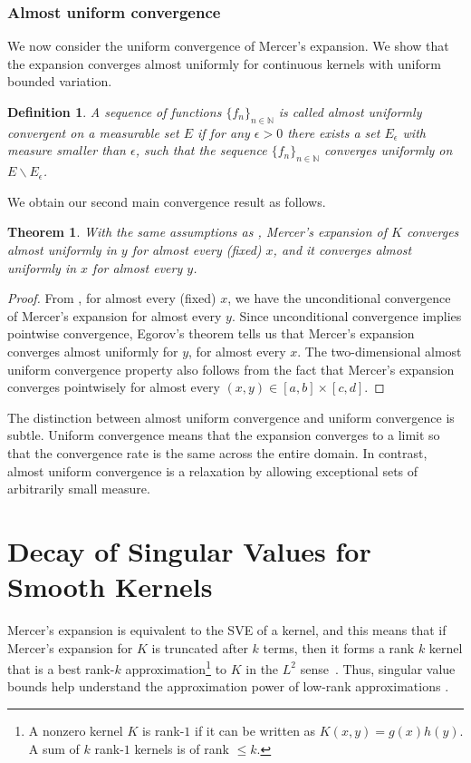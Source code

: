 \documentclass{article}
\newtheorem{theorem}{Theorem}
\newtheorem{definition}{Definition}
\begin{document}
\subsubsection{Almost uniform convergence}
We now consider the uniform convergence of Mercer's expansion. We show that the expansion converges almost uniformly for continuous kernels with uniform bounded variation.
\begin{definition}
A sequence of functions $\{f_n\}_{n\in\mathbb{N}}$ is called almost uniformly convergent on a measurable set $E$ if for any $\epsilon>0$ there exists a set $E_\epsilon$ with measure smaller than $\epsilon$, such that the sequence $\{f_n\}_{n\in\mathbb{N}}$ converges uniformly on $E\backslash E_\epsilon$.
\end{definition}

We obtain our second main convergence result as follows. 
\begin{theorem}\label{thm:almostuniform}
With the same assumptions as , Mercer's expansion of $K$ converges almost uniformly in $y$ for almost every (fixed) $x$, and it converges almost uniformly in $x$ for almost every $y$. 
\end{theorem}
\begin{proof}
From , for almost every (fixed) $x$, we have the unconditional convergence of Mercer's expansion for almost every $y$. Since unconditional convergence implies pointwise convergence, Egorov's theorem \citep{egoroff1911suites} tells us that Mercer's expansion converges almost uniformly for $y$, for almost every $x$. The two-dimensional almost uniform convergence property also follows from the fact that Mercer's expansion converges pointwisely for almost every $(x, y)\in[a,b]\times [c,d]$. 
\end{proof}

The distinction between almost uniform convergence and uniform convergence is subtle. Uniform convergence means that the expansion converges to a limit so that the convergence rate is the same across the entire domain. In contrast, almost uniform convergence is a relaxation by allowing exceptional sets of arbitrarily small measure. 

\section{Decay of Singular Values for Smooth Kernels}\label{sec:singularvaluedecay}

Mercer's expansion is equivalent to the SVE of a kernel, and this means that if Mercer's expansion for $K$ is truncated after $k$ terms, then it forms a rank $k$ kernel that is a best rank-$k$ approximation\footnote{A nonzero kernel $K$ is rank-$1$ if it can be written as $K(x,y) = g(x)h(y)$. A sum of $k$ rank-$1$ kernels is of rank $\leq k$.} to $K$ in the $L^2$ sense~\citep{schmidt1907theorie}. Thus, singular value bounds help understand the approximation power of low-rank approximations \citep{reade1983eigenvalues,townsend2014computing}. 
\end{document}
